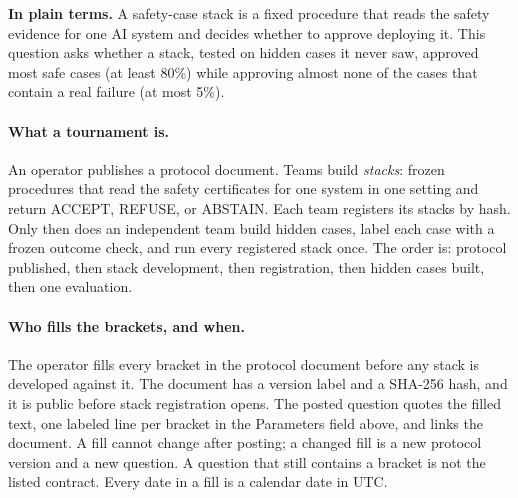 \begin{predictionbackground}
\textbf{In plain terms.}
A safety-case stack is a fixed procedure that reads the safety evidence for one AI system and decides whether to approve deploying it.
This question asks whether a stack, tested on hidden cases it never saw, approved most safe cases (at least 80\%) while approving almost none of the cases that contain a real failure (at most 5\%).

\paragraph{What a tournament is.}
An operator publishes a protocol document.
Teams build \emph{stacks}: frozen procedures that read the safety certificates for one system in one setting and return ACCEPT, REFUSE, or ABSTAIN.
Each team registers its stacks by hash.
Only then does an independent team build hidden cases, label each case with a frozen outcome check, and run every registered stack once.
The order is: protocol published, then stack development, then registration, then hidden cases built, then one evaluation.

\paragraph{Who fills the brackets, and when.}
The operator fills every bracket in the protocol document before any stack is developed against it.
The document has a version label and a SHA-256 hash, and it is public before stack registration opens.
The posted question quotes the filled text, one labeled line per bracket in the Parameters field above, and links the document.
A fill cannot change after posting; a changed fill is a new protocol version and a new question.
A question that still contains a bracket is not the listed contract.
Every date in a fill is a calendar date in UTC.


\end{predictionbackground}

